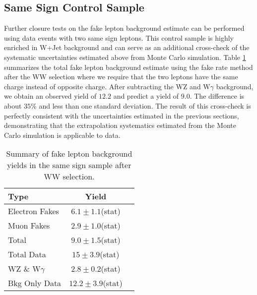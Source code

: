 \subsection{Same Sign Control Sample}

Further closure tests on the fake lepton background estimate can be performed using data events
with two same sign leptons. This control sample is highly enriched in W+Jet background and 
can serve as an additional cross-check of the systematic uncertainties estimated above from 
Monte Carlo simulation. Table \ref{tab:FakeLeptonBkgPrediction_SameSignSample} summarizes the 
total fake lepton background estimate using the fake rate method after the WW selection 
where we require that the two leptons have the same charge instead of opposite charge. After
subtracting the WZ and W$\gamma$ background, we obtain an observed yield of $12.2$ and 
predict a yield of $9.0$. The difference is about $35\%$ and less than one standard deviation.
The result of this cross-check is perfectly consistent with the uncertainties 
estimated in the previous sections, demonstrating that the extrapolation systematics
estimated from the Monte Carlo simulation is applicable to data.


\begin{table}[!htbp]
\begin{center}
\begin{tabular}{|l|c|c|}
\hline
Type           & Yield \\
\hline
Electron Fakes          &  $6.1 \pm 1.1$(stat)   \\
Muon Fakes              &  $2.9 \pm 1.0$(stat)   \\
Total                   &  $9.0 \pm 1.5$(stat)   \\
\hline
Total Data              &  $15  \pm 3.9$(stat)   \\
WZ \& W$\gamma$         &  $2.8 \pm 0.2$(stat)   \\
Bkg Only Data           &  $12.2 \pm 3.9$(stat)   \\

\hline
\end{tabular}
\caption{Summary of fake lepton background yields in the same sign sample after WW selection. }
\label{tab:FakeLeptonBkgPrediction_SameSignSample}
\end{center}
\end{table}
